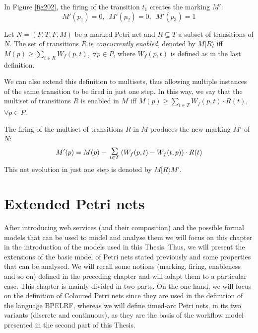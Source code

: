 \begin{example} In Figure \ref{fig202}, the firing of the transition $t_1$
creates the marking $M'$:
\[ M'(p_1) = 0,\,\,\,M'(p_2)=0,\,\,\,M'(p_3)=1 \]
\end{example}

\begin{definition} 
Let $N= (P,T,F,M)$ be a marked Petri net and $R \subseteq T$ a subset of transitions of $N$.
The set of transitions $R$ is \emph{concurrently enabled}, denoted by $M [ R \rangle$
iff $M(p) \geq \sum_{t \in R} W_f(p,t),~
\forall p\in P$, where
$W_f(p,t)$ is defined as in the last definition.

We can also extend this definition to multisets, thus allowing
multiple instances of the same transition to be fired in just one step.
In this way, we say that the multiset of transitions $R$ 
is enabled in $M$ iff $M(p)
\geq \sum_{t \in T} W_f(p,t) \cdot R(t)$, $\forall p \in P$.

The firing of the multiset of transitions $R$ in $M$ 
produces the new marking $M'$ of $N$:
\[ M'(p) = M(p) - \sumas{t \in T} (W_f(p,t) - W_f(t,p)) \cdot R(t)\]
This net evolution in just one step is denoted by
$M[ R \rangle M'$.
\end{definition}

\chapter{Extended Petri nets}\label{chapter:extended}
After introducing web services (and their composition) and the possible formal models
that can be used to model and analyse them
we will focus on this chapter in the introduction of the models used in this Thesis. Thus, we
will present the extensions of the basic model of Petri nets stated previously and some properties
that can be analysed. We will recall some notions (marking, firing, enableness and so on) defined in the preceding chapter
and will adapt them to a particular case. This chapter is mainly divided in two parts. On the one hand,
we will focus on the definition of Coloured Petri nets since they are used in the definition of the language BPELRF, whereas
we will define timed-arc Petri nets, in its two variants (discrete and continuous), as they are the basis of the workflow model presented in the
second part of this Thesis.

